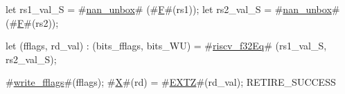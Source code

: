 let rs1_val_S = #\hyperref[sailRISCVznanzyunbox]{nan\_unbox}# (#\hyperref[sailRISCVzF]{F}#(rs1));
let rs2_val_S = #\hyperref[sailRISCVznanzyunbox]{nan\_unbox}# (#\hyperref[sailRISCVzF]{F}#(rs2));

let (fflags, rd_val) : (bits_fflags, bits_WU) =
    #\hyperref[sailRISCVzriscvzyf32Eq]{riscv\_f32Eq}# (rs1_val_S, rs2_val_S);

#\hyperref[sailRISCVzwritezyfflags]{write\_fflags}#(fflags);
#\hyperref[sailRISCVzX]{X}#(rd) = #\hyperref[sailRISCVzEXTZ]{EXTZ}#(rd_val);
RETIRE_SUCCESS
